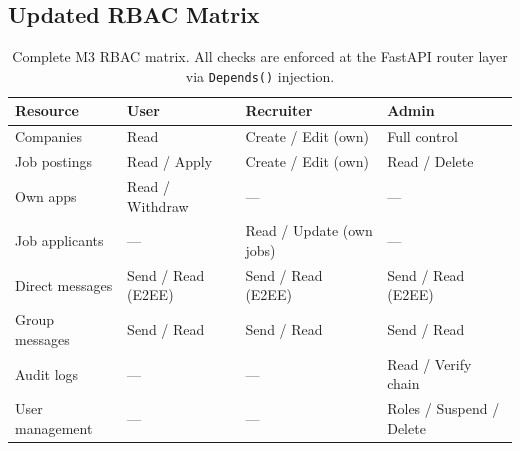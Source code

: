 \subsection{Updated RBAC Matrix}

\begin{table}[H]
\centering
\small
\begin{tabular}{p{3cm} p{2.5cm} p{3cm} p{3cm}}
    \toprule
    \textbf{Resource} & \textbf{User} & \textbf{Recruiter} & \textbf{Admin} \\
    \midrule
    Companies      & Read          & Create / Edit (own)  & Full control \\
    Job postings   & Read / Apply  & Create / Edit (own)  & Read / Delete \\
    Own apps       & Read / Withdraw & —               & — \\
    Job applicants & —             & Read / Update (own jobs) & — \\
    Direct messages & Send / Read (E2EE) & Send / Read (E2EE) & Send / Read (E2EE) \\
    Group messages & Send / Read   & Send / Read          & Send / Read \\
    Audit logs     & —             & —                   & Read / Verify chain \\
    User management & —            & —                   & Roles / Suspend / Delete \\
    \bottomrule
\end{tabular}
\caption{Complete M3 RBAC matrix. All checks are enforced at the FastAPI router layer via \texttt{Depends()} injection.}
\end{table}
